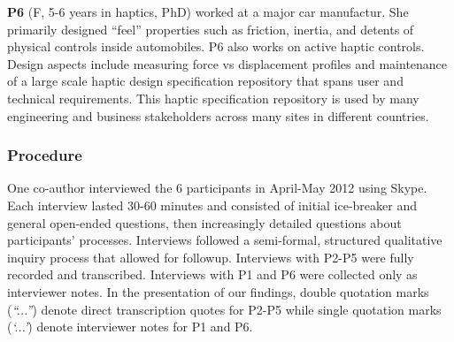        \textbf{P6} (F, 5-6 years in haptics, PhD) worked at a major car manufactur. %
        She primarily designed ``feel'' properties such as friction, inertia, and detents of physical controls inside automobiles.
        P6 also works on active haptic controls.
        Design aspects include measuring force vs displacement profiles and maintenance of a large scale haptic design specification repository that spans user and technical requirements.
        This haptic specification repository is used by many engineering and business stakeholders across many sites in different countries.
        



\subsubsection{Procedure}
\noindent
One  co-author %
interviewed the 6 participants in April-May 2012 using Skype.
Each interview lasted 30-60 minutes and consisted of initial ice-breaker and general open-ended questions, then increasingly detailed questions about participants' processes.
Interviews followed a semi-formal, structured qualitative inquiry process that allowed for followup. %
Interviews with P2-P5 were fully recorded and transcribed. Interviews with P1 and P6 were collected only as interviewer notes. In the presentation of %
our findings, double quotation marks (\textit{``...''}) denote direct transcription quotes for P2-P5 while single quotation marks (\textit{`...'}) denote interviewer notes for P1 and P6. %



